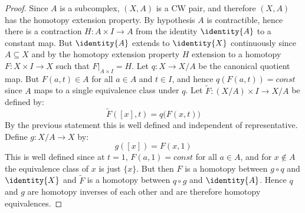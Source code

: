 \documentclass{book}                                                           %
\begin{document}
                \begin{proof}
                    Since $A$ is a subcomplex, $(X,A)$ is a CW pair, and
                    therefore $(X,A)$ has the homotopy extension property. By
                    hypothesis $A$ is contractible, hence there is a contraction
                    $H:A\times{I}\rightarrow{A}$ from the identity
                    $\identity{A}$ to a constant map. But $\identity{A}$ extends
                    to $\identity{X}$ continuously since $A\subseteq{X}$ and
                    by the homotopy extension property $H$ extension to a
                    homotopy $F:X\times{I}\rightarrow{X}$ such that
                    $F|_{A\times{I}}=H$. Let $q:X\rightarrow{X}/A$ be the
                    canonical quotient map. But $F(a,t)\in{A}$ for all $a\in{A}$
                    and $t\in{I}$, and hence $q(F(a,t))=const$ since $A$ maps to
                    a single equivalence class under $q$. Let
                    $\tilde{F}:(X/A)\times{I}\rightarrow{X}/A$ be defined by:
                    \begin{equation}
                        \tilde{F}([x],t)=q\big(F(x,t)\big)
                    \end{equation}
                    By the previous statement this is well defined and
                    independent of representative. Define $g:X/A\rightarrow{X}$
                    by:
                    \begin{equation}
                        g([x])=F(x,1)
                    \end{equation}
                    This is well defined since at $t=1$, $F(a,1)=const$ for all
                    $a\in{A}$, and for $x\notin{A}$ the equivalence class of $x$
                    is just $\{x\}$. But then $F$ is a homotopy between
                    $g\circ{q}$ and $\identity{X}$ and $\tilde{F}$ is a homotopy
                    between $q\circ{g}$ and $\identity{A}$. Hence $q$ and $g$
                    are homotopy inverses of each other and are therefore
                    homotopy equivalences.
                \end{proof}
\end{document}

